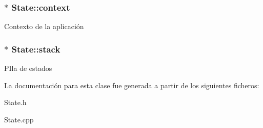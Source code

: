 \subsubsection[{context}]{$\ast$ State\+::context\hspace{0.3cm}{\ttfamily [protected]}}\label{classState_adc93e8ad3199b5891618ca88eed0436a}
Contexto de la aplicación \hypertarget{classState_a86c8d3a5a1ee89896828be85a785fb04}{}
\subsubsection[{stack}]{$\ast$ State\+::stack\hspace{0.3cm}{\ttfamily [protected]}}\label{classState_a86c8d3a5a1ee89896828be85a785fb04}
P\+Ila de estados 

La documentación para esta clase fue generada a partir de los siguientes ficheros\+:\begin{DoxyCompactItemize}
\item 
State.\+h\item 
State.\+cpp\end{DoxyCompactItemize}
